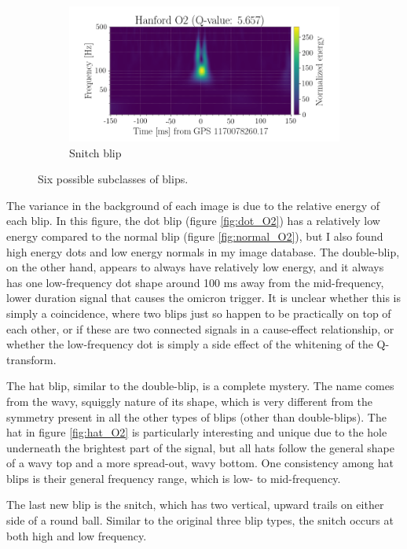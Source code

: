 \documentclass[a4paper]{article}
\begin{document}
\begin{figure}[h!]
\begin{subfigure}{.49\textwidth}
		\centering
		\includegraphics[width=1\linewidth]{snitch_O2}
		\caption{Snitch blip}
		\label{fig:snitch_O2}
	\end{subfigure}
	\caption{Six possible subclasses of blips.}
	\label{fig:six}
\end{figure}

The variance in the background of each image is due to the relative energy of each blip. In this figure, the dot blip (figure \ref{fig:dot_O2}) has a relatively low energy compared to the normal blip (figure \ref{fig:normal_O2}), but I also found high energy dots and low energy normals in my image database. The double-blip, on the other hand, appears to always have relatively low energy, and it always has one low-frequency dot shape around 100 ms away from the mid-frequency, lower duration signal that causes the omicron trigger. It is unclear whether this is simply a coincidence, where two blips just so happen to be practically on top of each other, or if these are two connected signals in a cause-effect relationship, or whether the low-frequency dot is simply a side effect of the whitening of the Q-transform.

The hat blip, similar to the double-blip, is a complete mystery. The name comes from the wavy, squiggly nature of its shape, which is very different from the symmetry present in all the other types of blips (other than double-blips). The hat in figure \ref{fig:hat_O2} is particularly interesting and unique due to the hole underneath the brightest part of the signal, but all hats follow the general shape of a wavy top and a more spread-out, wavy bottom. One consistency among hat blips is their general frequency range, which is low- to mid-frequency.

The last new blip is the snitch, which has two vertical, upward trails on either side of a round ball. Similar to the original three blip types, the snitch occurs at both high and low frequency. 
\end{document}
